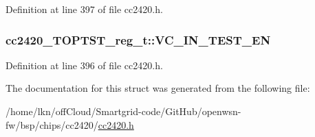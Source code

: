 Definition at line 397 of file cc2420.\+h.

\subsubsection[{\texorpdfstring{V\+C\+\_\+\+I\+N\+\_\+\+T\+E\+S\+T\+\_\+\+EN}{VC_IN_TEST_EN}}]{ cc2420\+\_\+\+T\+O\+P\+T\+S\+T\+\_\+reg\+\_\+t\+::\+V\+C\+\_\+\+I\+N\+\_\+\+T\+E\+S\+T\+\_\+\+EN}\hypertarget{structcc2420___t_o_p_t_s_t__reg__t_acef5d905a0c25368df7b0b34870687ec}{}\label{structcc2420___t_o_p_t_s_t__reg__t_acef5d905a0c25368df7b0b34870687ec}


Definition at line 396 of file cc2420.\+h.



The documentation for this struct was generated from the following file\+:\begin{DoxyCompactItemize}
\item 
/home/lkn/off\+Cloud/\+Smartgrid-\/code/\+Git\+Hub/openwsn-\/fw/bsp/chips/cc2420/\hyperlink{cc2420_8h}{cc2420.\+h}\end{DoxyCompactItemize}
